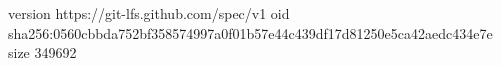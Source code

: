 version https://git-lfs.github.com/spec/v1
oid sha256:0560cbbda752bf358574997a0f01b57e44c439df17d81250e5ca42aedc434e7e
size 349692
